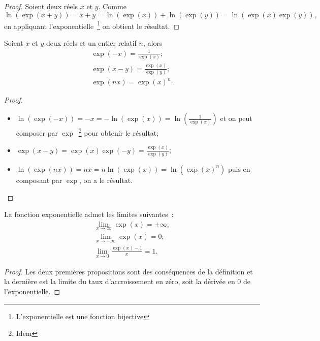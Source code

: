 \begin{proof} 
  Soient deux réels $x$ et $y$. Comme 
  \begin{equation}
    \ln(\exp(x+y))=x+y=\ln(\exp(x))+\ln(\exp(y))=\ln(\exp(x) \exp(y)),
  \end{equation}
  en appliquant l'exponentielle~\footnote{L'exponentielle est une fonction bijective} on obtient le résultat.
\end{proof}
%
\begin{prop} 
  Soient $x$ et $y$ deux réels et un entier relatif $n$, alors
  \begin{gather}
    \exp(-x)=\frac{1}{\exp(x)}; \\
    \exp(x-y)=\frac{\exp(x)}{\exp(y)}; \\
    \exp(nx)=\exp(x)^n.
  \end{gather}
\end{prop}
\begin{proof} 
  \begin{itemize} 
  \item $\ln(\exp(-x))=-x=-\ln(\exp(x))=\ln \left(\frac{1}{\exp(x)}\right)$ et on peut composer par $\exp$~\footnote{Idem} pour obtenir le résultat;
  \item $\exp(x-y)=\exp(x) \exp(-y)=\frac{\exp(x)}{\exp(y)}$;
  \item $\ln(\exp(nx))=nx=n \ln(\exp(x))=\ln(\exp(x)^n)$ puis en composant par $\exp$, on a le résultat.
  \end{itemize}
\end{proof}
%
\begin{prop} 
  La fonction exponentielle admet les limites suivantes~:
  \begin{gather}
    \lim\limits_{x \to \infty} \exp(x)=+\infty;\\
    \lim\limits_{x \to -\infty} \exp(x)=0;\\
    \lim\limits_{x \to 0} \frac{\exp(x)-1}{x}=1.
  \end{gather}
\end{prop}
\begin{proof} 
  Les deux premières propositions sont des conséquences de la définition et la dernière est la limite du taux d'accroissement en zéro, soit la dérivée en 0 de l'exponentielle.
\end{proof}
%
